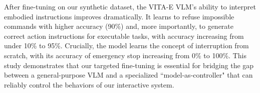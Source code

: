 After fine-tuning on our synthetic dataset, the VITA-E VLM's ability to interpret embodied instructions improves dramatically. It learns to refuse impossible commands with higher accuracy (90\%) and, more importantly, to generate correct action instructions for executable tasks, with accuracy increasing from under 10\% to 95\%. Crucially, the model learns the concept of interruption from scratch, with its accuracy of emergency stop increasing from 0\% to 100\%. This study demonstrates that our targeted fine-tuning is essential for bridging the gap between a general-purpose VLM and a specialized ``model-as-controller" that can reliably control the behaviors of our interactive system.
